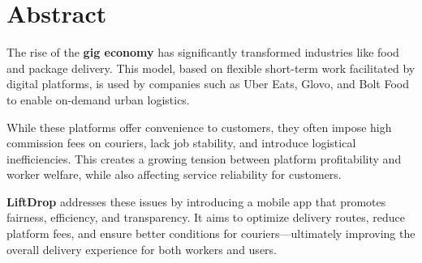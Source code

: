 \section*{Abstract}

The rise of the \textbf{gig economy} has significantly transformed industries like food and package delivery. This model, based on flexible short-term work facilitated by digital platforms, is used by companies such as Uber Eats, Glovo, and Bolt Food to enable on-demand urban logistics.

\bigskip

While these platforms offer convenience to customers, they often impose high commission fees on couriers, lack job stability, and introduce logistical inefficiencies. This creates a growing tension between platform profitability and worker welfare, while also affecting service reliability for customers.

\bigskip

\textbf{LiftDrop} addresses these issues by introducing a mobile app that promotes fairness, efficiency, and transparency. It aims to optimize delivery routes, reduce platform fees, and ensure better conditions for couriers—ultimately improving the overall delivery experience for both workers and users.
